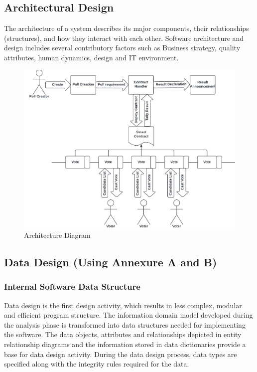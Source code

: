 \documentclass[oneside, 12pt]{book}
\begin{document}
\subsection{Architectural Design}
The architecture of a system describes its major components, their relationships (structures), and how they interact with each other. Software architecture and design includes several contributory factors such as Business strategy, quality attributes, human dynamics, design and IT environment.
\begin{figure}[H]
	\centering
	\includegraphics[width=\linewidth]{./Resources/architecture.png}
	\caption{Architecture Diagram}
	\label{fig:architecture}
\end{figure}
\subsection{Data Design (Using Annexure A and B)}
\subsubsection{Internal Software Data Structure}
Data design is the first design activity, which results in less complex, modular and efficient program structure. The information domain model developed during the analysis phase is transformed into data structures needed for implementing the software. The data objects, attributes and relationships depicted in entity relationship diagrams and the information stored in data dictionaries provide a base for data design activity. During the data design process, data types are specified along with the integrity rules required for the data.
\end{document}
